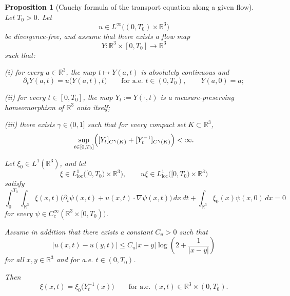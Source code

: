 \documentclass[10pt,a4paper]{amsart}
\newtheorem{proposition}{Proposition}
\begin{document}
\begin{proposition}[Cauchy formula of the transport equation along a given flow]
\label{prop:transport_by_flow}
Let $T_0>0$. Let
\[
u\in L^\infty\bigl((0,T_0)\times\mathbb R^3\bigr)
\]
be divergence-free, and assume that there exists a flow map
\[
Y:\mathbb R^3\times[0,T_0]\to\mathbb R^3
\]
such that:

\smallskip
\noindent
(i) for every $a\in\mathbb R^3$, the map $t\mapsto Y(a,t)$ is absolutely continuous and
\[
\partial_tY(a,t)=u\big(Y(a,t),t\big)
\qquad\text{for a.e. }t\in(0,T_0),
\qquad
Y(a,0)=a;
\]

\smallskip
\noindent
(ii) for every $t\in[0,T_0]$, the map $Y_t:=Y(\cdot,t)$ is a measure-preserving
homeomorphism of $\mathbb R^3$ onto itself;

\smallskip
\noindent
(iii) there exists $\gamma\in(0,1]$ such that for every compact set $K\subset\mathbb R^3$,
\[
\sup_{t\in[0,T_0]}
\Bigl(
[Y_t]_{C^\gamma(K)}+[Y_t^{-1}]_{C^\gamma(K)}
\Bigr)
<\infty .
\]

Let $\xi_0\in L^1(\mathbb R^3)$, and let
\[
\xi\in L^1_{\mathrm{loc}}\bigl([0,T_0)\times\mathbb R^3\bigr),
\qquad
u\xi\in L^1_{\mathrm{loc}}\bigl([0,T_0)\times\mathbb R^3\bigr)
\]
satisfy
\begin{equation}
\label{eq:transport_distributional_appendix}
\int_0^{T_0}\int_{\mathbb R^3}
\xi(x,t)\bigl(\partial_t\psi(x,t)+u(x,t)\cdot\nabla\psi(x,t)\bigr)\,dx\,dt
+\int_{\mathbb R^3}\xi_0(x)\psi(x,0)\,dx
=0
\end{equation}
for every $\psi\in C_c^\infty(\mathbb R^3\times[0,T_0))$.

Assume in addition that there exists a constant $C_u>0$ such that
\begin{equation}
\label{eq:u_loglip_appendix}
|u(x,t)-u(y,t)|
\le
C_u |x-y|\log\!\left(2+\frac{1}{|x-y|}\right)
\end{equation}
for all $x,y\in\mathbb R^3$ and for a.e. $t\in(0,T_0)$.

Then
\[
\xi(x,t)=\xi_0\bigl(Y_t^{-1}(x)\bigr)
\qquad
\text{for a.e. }(x,t)\in\mathbb R^3\times(0,T_0).
\]
\end{proposition}
\end{document}
